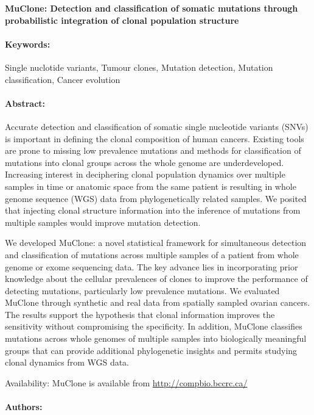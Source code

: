 \noindent
\large {\bf MuClone: Detection and classification of somatic mutations through probabilistic integration of clonal population structure} 


\normalsize 


\noindent \paragraph{Keywords:} Single nuclotide variants, Tumour clones, Mutation detection,
Mutation classification, Cancer evolution

\noindent \paragraph{Abstract:} 


Accurate detection and classification of somatic single
nucleotide variants (SNVs) is important in defining the clonal
composition of human cancers. Existing tools are prone to missing
low prevalence mutations and methods for classification of mutations
into clonal groups across the whole genome are underdeveloped.
Increasing interest in deciphering clonal population dynamics over
multiple samples in time or anatomic space from the same
patient is resulting in whole genome sequence (WGS) data from
phylogenetically related samples. We posited that injecting clonal
structure information into the inference of mutations from multiple
samples would improve mutation detection.

 We developed MuClone: a novel statistical framework for
simultaneous detection and classification of mutations across multiple
samples of a patient from whole genome or exome sequencing
data. The key advance lies in incorporating prior knowledge about
the cellular prevalences of clones to improve the performance
of detecting mutations, particularly low prevalence mutations. We
evaluated MuClone through synthetic and real data from spatially
sampled ovarian cancers. The results support the hypothesis that
clonal information improves the sensitivity without compromising the
specificity. In addition, MuClone classifies mutations across whole
genomes of multiple samples into biologically meaningful groups that
can provide additional phylogenetic insights and permits studying
clonal dynamics from WGS data.

Availability: MuClone is available from \url{http://compbio.bccrc.ca/}

\noindent \paragraph{Authors:} 

